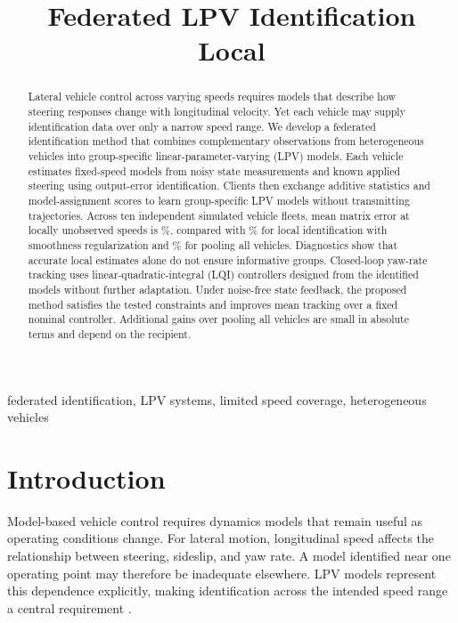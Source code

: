 \documentclass[conference]{IEEEtran}
\title{Federated LPV Identification \revred{for Heterogeneous}\\\revred{Vehicles with} \rev{Limited} Local \rev{Speed} \revred{Coverage}}
\author{}
\author{\IEEEauthorblockN{Jakob Weber et al.}
\IEEEauthorblockA{Author list and affiliations to be completed}}
\newcommand{\revisioncolor}{black}
\newcommand{\rev}[1]{\textcolor{revisiongreen}{#1}}
\newcommand{\revred}[1]{\textcolor{revisionred}{#1}}
\begin{document}
\maketitle
\begin{abstract}
\begingroup
\rev{Lateral vehicle control across varying speeds requires models that describe
how steering responses change with longitudinal velocity. Yet each vehicle
may supply} identification data \rev{over} only \rev{a} narrow speed \rev{range. We develop}
\revred{a federated identification method that combines complementary observations
from heterogeneous vehicles into group-specific} linear-parameter-varying (LPV) models.
\rev{Each vehicle estimates} fixed-speed models from \rev{noisy state
measurements} and known applied steering \rev{using} output-error \rev{identification.
Clients then exchange additive} statistics and \rev{model-assignment} scores \rev{to
learn group-specific} LPV \rev{models} without \rev{transmitting} trajectories.
Across ten independent simulated vehicle fleets, mean matrix error at
locally unobserved speeds is \OEFederatedUnseen\%, compared with
\OESmoothLocalUnseen\% for \rev{local identification with smoothness regularization}
and \OEGlobalUnseen\% for \rev{pooling all vehicles}. Diagnostics show that
accurate local estimates alone do not ensure \rev{informative groups.
Closed-loop yaw-rate tracking uses} linear-quadratic-integral (LQI)
\rev{controllers designed from} the \rev{identified models without further adaptation. Under noise-free state feedback,
the proposed method satisfies} the tested constraints and improves mean
tracking over \rev{a} fixed nominal controller. \rev{Additional} gains over \rev{pooling
all vehicles} are small in absolute terms and depend on the recipient.
\endgroup
\end{abstract}
\begin{IEEEkeywords}
federated identification, LPV systems, \rev{limited speed} coverage,
heterogeneous vehicles
\end{IEEEkeywords}

\section{Introduction}
\begingroup\color{\revisioncolor}
Model-based vehicle control requires dynamics models that remain useful as
operating conditions change. For lateral motion, longitudinal speed affects
the relationship between steering, sideslip, and yaw rate. A model identified
near one operating point may therefore be inadequate elsewhere. LPV models
represent this dependence explicitly, making identification across the intended
speed range a central requirement \cite{toth2010lpv,bamieh2002}.
\end{document}
